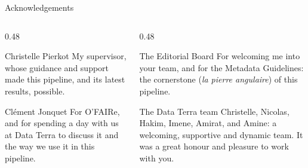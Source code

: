 \documentclass[aspectratio=169,10pt]{beamer}
\begin{document}
\begin{frame}{Acknowledgements}
  \begin{columns}[T]
    \begin{column}{0.48\textwidth}
      \begin{block}{Christelle Pierkot}
        \small My supervisor, whose guidance and support made this pipeline, and its latest results,
        possible.
      \end{block}
      \begin{block}{Clément Jonquet}
        \small For O'FAIRe, and for spending a day with us at Data Terra to discuss it and the way
        we use it in this pipeline.
      \end{block}
    \end{column}
    \begin{column}{0.48\textwidth}
      \begin{block}{The Editorial Board}
        \small For welcoming me into your team, and for the Metadata Guidelines: the cornerstone
        (\emph{la pierre angulaire}) of this pipeline.
      \end{block}
      \begin{block}{The Data Terra team}
        \small Christelle, Nicolas, Hakim, Imene, Amirat, and Amine: a welcoming, supportive and dynamic team.
        It was a great honour and pleasure to work with you.
      \end{block}
    \end{column}
  \end{columns}
\end{frame}
\end{document}
